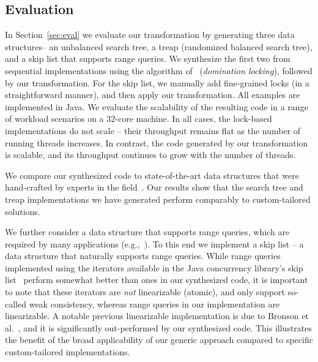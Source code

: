 \subsection{Evaluation}
In Section~\ref{sec:eval} we evaluate our transformation by generating three data structures-- an unbalanced search tree, a treap
(randomized balanced search tree),
and a skip list that supports range queries. We synthesize the first two from sequential implementations using the algorithm of~\cite{Gueta2011} (\emph{domination locking}), followed by our transformation.
For the skip list, we manually add fine-grained locks (in a straightforward manner), and then apply our transformation.
All examples are implemented in Java. We evaluate the scalability of the resulting code
in a range of workload scenarios on a $32$-core machine.
In all cases, the lock-based implementations do not scale --
their throughput remains flat as the number of running threads increases. In contrast, the code generated by our transformation
is scalable, and its throughput continues to grow with the number of threads.

We compare our synthesized code to state-of-the-art data structures
that were hand-crafted by experts in the field~\cite{DrachslerVY2014,BronsonCCO2010,ConcurrentSkipList,fraser2004practical}.
Our results show that the search tree and treap implementations we have generated
perform comparably to custom-tailored solutions.

We further consider a data structure that supports range queries, which are required by
many applications (e.g.,~\cite{levelDB,FerroJKRY14}). To this end we implement a skip list -- a data structure that naturally supports range queries.
While range queries implemented using the iterators available in the Java concurrency library's skip list~\cite{ConcurrentSkipList} perform
somewhat better than ones in our synthesized code, it is important to note that these iterators are \emph{not}
linearizable (atomic), and only support so-called weak consistency, whereas range queries in our implementation are linearizable.
A notable previous linearizable implementation is due to Bronson et al.~\cite{BronsonCCO2010},
and it is significantly out-performed by our synthesized code.
%
This illustrates the benefit of the broad applicability
of our generic approach compared to specific custom-tailored implementations.

